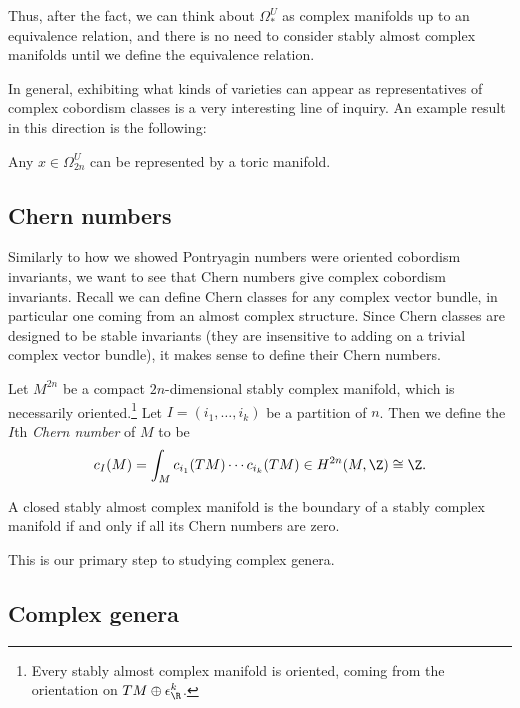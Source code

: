 \documentclass[11pt]{book}
\begin{document}
Thus, after the fact, we can think about $\Omega_\ast^U$ as complex manifolds up to an equivalence relation, and there is no need to consider stably almost complex manifolds until we define the equivalence relation.

In general, exhibiting what kinds of varieties can appear as representatives of complex cobordism classes is a very interesting line of inquiry. An example result in this direction is the following:

\begin{theorem} Any $x\in \Omega^U_{2n}$ can be represented by a toric manifold.
\end{theorem}

\subsection{Chern numbers}

Similarly to how we showed Pontryagin numbers were oriented cobordism invariants, we want to see that Chern numbers give complex cobordism invariants. Recall we can define Chern classes for any complex vector bundle, in particular one coming from an almost complex structure. Since Chern classes are designed to be stable invariants (they are insensitive to adding on a trivial complex vector bundle), it makes sense to define their Chern numbers.

\begin{notation} Let $M^{2n}$ be a compact $2n$-dimensional stably complex manifold, which is necessarily oriented.\footnote{Every stably almost complex manifold is oriented, coming from the orientation on $TM \oplus \epsilon_\R^k$.} Let $I = (i_1, \ldots, i_k)$ be a partition of $n$. Then we define the $I$th \emph{Chern number} of $M$ to be
\begin{align*}
    c_I(M) = \int_M c_{i_1}(TM) \cdots c_{i_k}(TM) \in H^{2n}(M,\Z) \cong \Z.
\end{align*}
\end{notation}

\begin{theorem} A closed stably almost complex manifold is the boundary of a stably complex manifold if and only if all its Chern numbers are zero.
\end{theorem}

This is our primary step to studying complex genera.

\subsection{Complex genera}
\end{document}
